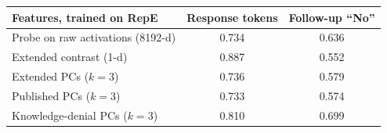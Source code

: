 \begin{tabular}{lcc}
\toprule
Features, trained on RepE & Response tokens & Follow-up ``No'' \\
\midrule
Probe on raw activations (8192-d) & 0.734 & 0.636 \\
Extended contrast (1-d) & 0.887 & 0.552 \\
Extended PCs ($k=3$) & 0.736 & 0.579 \\
Published PCs ($k=3$) & 0.733 & 0.574 \\
Knowledge-denial PCs ($k=3$) & 0.810 & 0.699 \\
\bottomrule
\end{tabular}